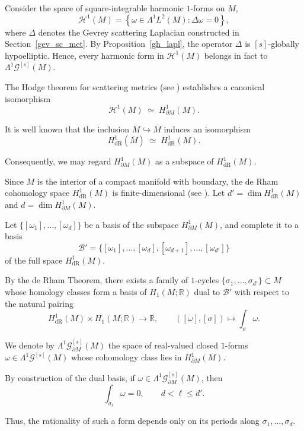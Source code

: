 \documentclass[11pt,reqno]{amsart}
\numberwithin{equation}{section}
\begin{document}
	Consider the space of square-integrable harmonic $1$-forms on $M$,
	\[
	\mathcal{H}^1(M) = \left\{ \omega \in \mathsf{\Lambda}^1 L^2(M) : \Delta \omega = 0 \right\},
	\]
	where $\Delta$ denotes the Gevrey scattering Laplacian constructed in Section~\ref{gev_sc_met}. By Proposition~\ref{gh_lapl}, the operator $\Delta$ is ${[s]}$-globally hypoelliptic. Hence, every harmonic form in $\mathcal{H}^1(M)$ belongs in fact to $\mathsf{\Lambda}^1 \mathscr{G}^{[s]}(M)$.
	
	The Hodge theorem for scattering metrics (see \cite[Theorem~6.2]{Melrose_GST}) establishes a canonical isomorphism
	\[
	\mathcal{H}^1(M) 	\;\simeq\; 	H^1_{\partial M}(M).
	\]
	
	It is well known that the inclusion $M \hookrightarrow \overline{M}$ induces an isomorphism
	\[
	H^1_{\mathrm{dR}}(\overline{M}) \;\simeq\;  H^1_{\mathrm{dR}}(M).
	\]
	
	Consequently, we may regard $H^1_{\partial M}(M)$ as a subspace of $H^1_{\mathrm{dR}}(M)$.
	
	Since $M$ is the interior of a compact manifold with boundary, the de Rham cohomology space $H^1_{\mathrm{dR}}(M)$ is finite-dimensional (see \cite[Remark 2.8]{CKMT}). Let $d' = \dim H^1_{\mathrm{dR}}(M)$ and $d=\dim H^1_{\partial M}(M)$.
	
	Let $\{[\omega_1],\dots,[\omega_d]\}$ be a basis of the subspace $H^1_{\partial M}(M)$, and complete it to a basis
	\[
	\mathcal{B}' = \{[\omega_1],\dots,[\omega_d],[\omega_{d+1}],\dots,[\omega_{d'}]\}
	\]
	of the full space $H^1_{\mathrm{dR}}(M)$.
	
	By the de Rham Theorem, there exists a family of $1$-cycles $\{\sigma_1,\dots,\sigma_{d'}\}	\subset M$ whose homology classes form a basis of $H_1(M;\mathbb{R})$ dual to $\mathcal{B}'$ with respect to the natural pairing 
	\[
	H^1_{\mathrm{dR}}(M)\times H_1(M;\mathbb{R}) \longrightarrow \mathbb{R}, \qquad ([\omega],[\sigma]) \longmapsto \int_\sigma \omega.
	\]
	
	We denote by $\mathsf{\Lambda}^1\mathscr{G}^{[s]}_{\partial M}(M)$ the space of real-valued closed $1$-forms
	$\omega \in \mathsf{\Lambda}^1\mathscr{G}^{[s]}(M)$ whose cohomology class lies in
	$H^1_{\partial M}(M)$.
	
	By construction of the dual basis, if $\omega \in \mathsf{\Lambda}^1\mathscr{G}^{[s]}_{\partial M}(M)$, then
	\[
	\int_{\sigma_\ell} \omega = 0, \qquad d < \ell \le d'.
	\]
	
	Thus, the rationality of such a form depends only on its periods along 	$\sigma_1, \dots, \sigma_d$.
	
\end{document}
